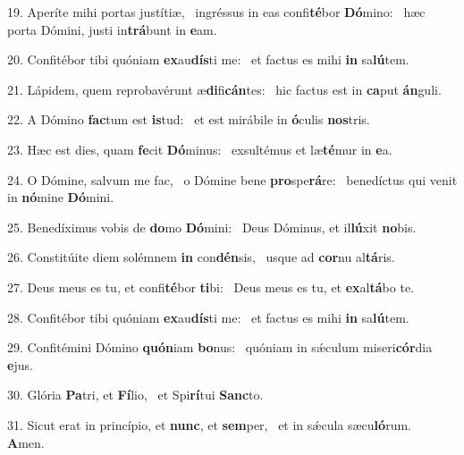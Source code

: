 19. Aperíte mihi portas justítiæ, \dag\  ingréssus in eas confi\textbf{té}bor \textbf{Dó}mino: \ast\  hæc porta Dómini, justi in\textbf{trá}bunt in \textbf{e}am.\

20. Confitébor tibi quóniam \textbf{ex}au\textbf{dís}ti me: \ast\  et factus es mihi \textbf{in} sa\textbf{lú}tem.\

21. Lápidem, quem reprobavérunt æ\textbf{di}fi\textbf{cán}tes: \ast\  hic factus est in \textbf{ca}put \textbf{án}guli.\

22. A Dómino \textbf{fac}tum est \textbf{is}tud: \ast\  et est mirábile in \textbf{ó}culis \textbf{nos}tris.\

23. Hæc est dies, quam \textbf{fe}cit \textbf{Dó}minus: \ast\  exsultémus et læ\textbf{té}mur in \textbf{e}a.\

24. O Dómine, salvum me fac, \dag\  o Dómine bene \textbf{pro}spe\textbf{rá}re: \ast\  benedíctus qui venit in \textbf{nó}mine \textbf{Dó}mini.\

25. Benedíximus vobis de \textbf{do}mo \textbf{Dó}mini: \ast\  Deus Dóminus, et il\textbf{lú}xit \textbf{no}bis.\

26. Constitúite diem solémnem \textbf{in} con\textbf{dén}sis, \ast\  usque ad \textbf{cor}nu al\textbf{tá}ris.\

27. Deus meus es tu, et confi\textbf{té}bor \textbf{ti}bi: \ast\  Deus meus es tu, et \textbf{ex}al\textbf{tá}bo te.\

28. Confitébor tibi quóniam \textbf{ex}au\textbf{dís}ti me: \ast\  et factus es mihi \textbf{in} sa\textbf{lú}tem.\

29. Confitémini Dómino \textbf{quón}iam \textbf{bo}nus: \ast\  quóniam in sǽculum miseri\textbf{cór}dia \textbf{e}jus.\

30. Glória \textbf{Pa}tri, et \textbf{Fí}lio, \ast\  et Spi\textbf{rí}tui \textbf{Sanc}to.\

31. Sicut erat in princípio, et \textbf{nunc}, et \textbf{sem}per, \ast\  et in sǽcula sæcu\textbf{ló}rum. \textbf{A}men.\

